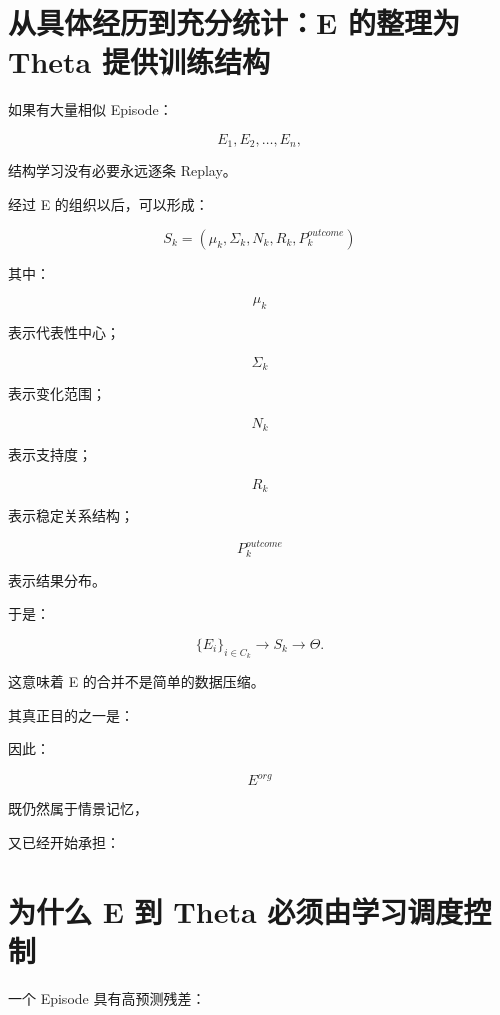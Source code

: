 \section{从具体经历到充分统计：E 的整理为 Theta 提供训练结构}

如果有大量相似 Episode：

\[
E_1,E_2,\ldots,E_n,
\]

结构学习没有必要永远逐条 Replay。

经过 E 的组织以后，可以形成：

\[
\boxed{
S_k
=
(
\mu_k,
\Sigma_k,
N_k,
R_k,
P_k^{outcome}
)
}
\]

其中：

\[
\mu_k
\]

表示代表性中心；

\[
\Sigma_k
\]

表示变化范围；

\[
N_k
\]

表示支持度；

\[
R_k
\]

表示稳定关系结构；

\[
P_k^{outcome}
\]

表示结果分布。

于是：

\[
\{
E_i
\}_{i\in C_k}
\rightarrow
S_k
\rightarrow
\Theta.
\]

这意味着 E 的合并不是简单的数据压缩。

其真正目的之一是：

\begin{statementbox}
\centering
{}
\end{statementbox}

因此：

\[
\boxed{
E^{org}
}
\]

既仍然属于情景记忆，

又已经开始承担：

\begin{statementbox}
\centering
{}
\end{statementbox}


\section{为什么 E 到 Theta 必须由学习调度控制}

一个 Episode 具有高预测残差：

